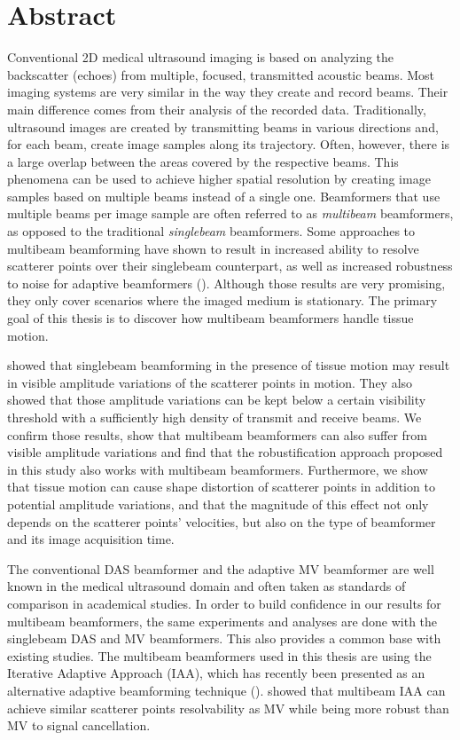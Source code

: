 
\chapter*{Abstract}
Conventional 2D medical ultrasound imaging is based on analyzing the backscatter 
(echoes) from multiple, focused, transmitted acoustic beams.
Most imaging systems are very similar in the way they create and record beams. Their main difference comes from their analysis of the recorded data.
Traditionally, ultrasound images are created by transmitting beams in various directions and, for each beam, create image samples along its trajectory.
Often, however, there is a large overlap between the areas covered by the respective beams.
This phenomena can be used to achieve higher spatial resolution by creating image samples based on multiple beams instead of a single one.
Beamformers that use multiple beams per image sample are often referred to as \textit{multibeam} beamformers, as opposed to the traditional \textit{singlebeam} beamformers.
Some approaches to multibeam beamforming have shown to result in increased ability to resolve scatterer points over their singlebeam counterpart, as well as increased robustness to noise for adaptive beamformers (\cite{Jensen_multibeam}).
Although those results are very promising, they only cover scenarios where the imaged medium is stationary.
The primary goal of this thesis is to discover how multibeam beamformers handle tissue motion.

\cite{Asen_shift_invariance} showed that singlebeam beamforming in the presence of tissue motion may result in visible amplitude variations of the scatterer points in motion. 
They also showed that those amplitude variations can be kept below a certain visibility threshold with a sufficiently high density of transmit and receive beams.
We confirm those results, show that multibeam beamformers can also suffer from visible amplitude variations and find that the robustification approach proposed in this study also works with multibeam beamformers.
Furthermore, we show that tissue motion can cause shape distortion of scatterer points in addition to potential amplitude variations, and that the magnitude of this effect not only depends on the scatterer points' velocities, but also on the type of beamformer and its image acquisition time.

The conventional DAS beamformer and the adaptive MV beamformer are well known in the medical ultrasound domain and often taken as standards of comparison in academical studies.
In order to build confidence in our results for multibeam beamformers, the same experiments and analyses are done with the singlebeam DAS and MV beamformers. This also provides a common base with existing studies.
The multibeam beamformers used in this thesis are using the Iterative Adaptive Approach (IAA), which has recently been presented as an alternative adaptive beamforming technique (\cite{Yardibi}).
\cite{Jensen_IAA} showed that multibeam IAA can achieve similar scatterer points resolvability as MV while being more robust than MV to signal cancellation.

